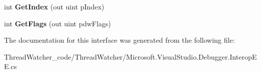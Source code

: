 \begin{DoxyCompactItemize}
\item 
\hypertarget{interface_microsoft_1_1_visual_studio_1_1_debugger_1_1_interop_e_e_1_1_i_debug_generic_param_field_a115f3c361e4c3c1997f0177bf6a1fdf9}{int {\bfseries Get\+Index} (out uint p\+Index)}\label{interface_microsoft_1_1_visual_studio_1_1_debugger_1_1_interop_e_e_1_1_i_debug_generic_param_field_a115f3c361e4c3c1997f0177bf6a1fdf9}

\item 
\hypertarget{interface_microsoft_1_1_visual_studio_1_1_debugger_1_1_interop_e_e_1_1_i_debug_generic_param_field_ac0f83f9c0e404e67ed6c5747781b1698}{int {\bfseries Get\+Flags} (out uint pdw\+Flags)}\label{interface_microsoft_1_1_visual_studio_1_1_debugger_1_1_interop_e_e_1_1_i_debug_generic_param_field_ac0f83f9c0e404e67ed6c5747781b1698}

\end{DoxyCompactItemize}


The documentation for this interface was generated from the following file\+:\begin{DoxyCompactItemize}
\item 
Thread\+Watcher\+\_\+code/\+Thread\+Watcher/Microsoft.\+Visual\+Studio.\+Debugger.\+Interop\+E\+E.\+cs\end{DoxyCompactItemize}
